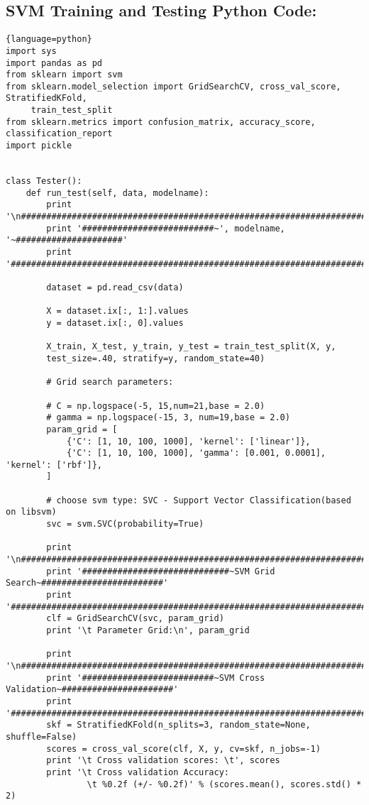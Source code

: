 \subsection{SVM Training and Testing Python Code:}
\begin{lstlisting}{language=python}    
import sys
import pandas as pd
from sklearn import svm
from sklearn.model_selection import GridSearchCV, cross_val_score, StratifiedKFold, 
     train_test_split
from sklearn.metrics import confusion_matrix, accuracy_score, classification_report
import pickle


class Tester():
    def run_test(self, data, modelname):
        print '\n######################################################################'
        print '##########################~', modelname, '~#####################'
        print '######################################################################'

        dataset = pd.read_csv(data)

        X = dataset.ix[:, 1:].values
        y = dataset.ix[:, 0].values

        X_train, X_test, y_train, y_test = train_test_split(X, y, 
        test_size=.40, stratify=y, random_state=40)

        # Grid search parameters:
		
        # C = np.logspace(-5, 15,num=21,base = 2.0)
        # gamma = np.logspace(-15, 3, num=19,base = 2.0)
        param_grid = [
            {'C': [1, 10, 100, 1000], 'kernel': ['linear']},
            {'C': [1, 10, 100, 1000], 'gamma': [0.001, 0.0001], 'kernel': ['rbf']},
        ]
		
		# choose svm type: SVC - Support Vector Classification(based on libsvm)
        svc = svm.SVC(probability=True)

        print '\n######################################################################'
        print '#############################~SVM Grid Search~########################'
        print '######################################################################'
        clf = GridSearchCV(svc, param_grid)
        print '\t Parameter Grid:\n', param_grid

        print '\n######################################################################'
        print '##########################~SVM Cross Validation~######################'
        print '######################################################################'
        skf = StratifiedKFold(n_splits=3, random_state=None, shuffle=False)
        scores = cross_val_score(clf, X, y, cv=skf, n_jobs=-1)
        print '\t Cross validation scores: \t', scores
        print '\t Cross validation Accuracy:
        		\t %0.2f (+/- %0.2f)' % (scores.mean(), scores.std() * 2)


\end{lstlisting}
